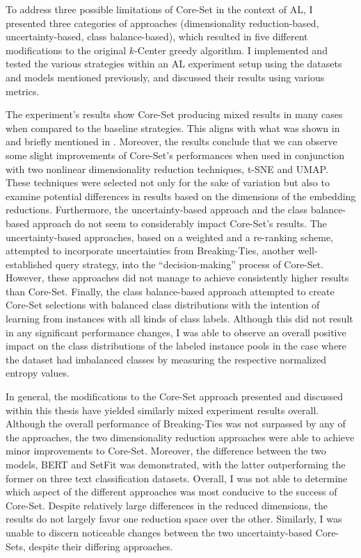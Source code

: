 \documentclass[english,bachelor,ul]{webisthesis} %
\begin{document}
To address three possible limitations of Core-Set in the context of AL, I presented three categories of approaches (dimensionality reduction-based, uncertainty-based, class balance-based), which resulted in five different modifications to the original $k$-Center greedy algorithm. I implemented and tested the various strategies within an AL experiment setup using the datasets and models mentioned previously, and discussed their results using various metrics. 

The experiment's results show Core-Set producing mixed results in many cases when compared to the baseline strategies. This aligns with what was shown in \cite{DBLP:conf/kdd/0002MM21} and briefly mentioned in \cite{DBLP:conf/aaai/ColemanCKCBBNSZ22}. Moreover, the results conclude that we can observe some slight improvements of Core-Set's performances when used in conjunction with two nonlinear dimensionality reduction techniques, t-SNE and UMAP. These techniques were selected not only for the sake of variation but also to examine potential differences in results based on the dimensions of the embedding reductions. Furthermore, the uncertainty-based approach and the class balance-based approach do not seem to considerably impact Core-Set's results. The uncertainty-based approaches, based on a weighted and a re-ranking scheme, attempted to incorporate uncertainties from Breaking-Ties, another well-established query strategy, into the ``decision-making'' process of Core-Set. However, these approaches did not manage to achieve consistently higher results than Core-Set. Finally, the class balance-based approach attempted to create Core-Set selections with balanced class distributions with the intention of learning from instances with all kinds of class labels. Although this did not result in any significant performance changes, I was able to observe an overall positive impact on the class distributions of the labeled instance pools in the case where the dataset had imbalanced classes by measuring the respective normalized entropy values.

In general, the modifications to the Core-Set approach presented and discussed within this thesis have yielded similarly mixed experiment results overall. Although the overall performance of Breaking-Ties was not surpassed by any of the approaches, the two dimensionality reduction approaches were able to achieve minor improvements to Core-Set. Moreover, the difference between the two models, BERT and SetFit was demonstrated, with the latter outperforming the former on three text classification datasets. Overall, I was not able to determine which aspect of the different approaches was most conducive to the success of Core-Set. Despite relatively large differences in the reduced dimensions, the results do not largely favor one reduction space over the other. Similarly, I was unable to discern noticeable changes between the two uncertainty-based Core-Sets, despite their differing approaches.
\end{document}
